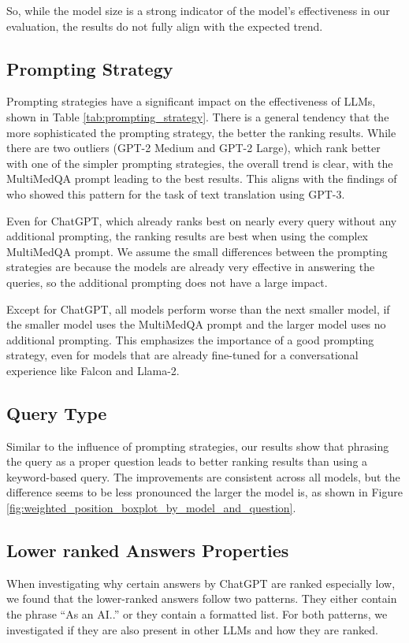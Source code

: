 So, while the model size is a strong indicator of the model's effectiveness in our evaluation, the results do not fully align with the expected trend.

\subsection{Prompting Strategy}
Prompting strategies have a significant impact on the effectiveness of LLMs, shown in Table \ref{tab:prompting_strategy}.
There is a general tendency that the more sophisticated the prompting strategy, the better the ranking results.
While there are two outliers (GPT-2 Medium and GPT-2 Large), which rank better with one of the simpler prompting strategies, the overall trend is clear, with the MultiMedQA prompt leading to the best results.
This aligns with the findings of \cite{reynolds:2021:Prompt} who showed this pattern for the task of text translation using GPT-3.

Even for ChatGPT, which already ranks best on nearly every query without any additional prompting, the ranking results are best when using the complex MultiMedQA prompt.
We assume the small differences between the prompting strategies are because the models are already very effective in answering the queries, so the additional prompting does not have a large impact.

Except for ChatGPT, all models perform worse than the next smaller model, if the smaller model uses the MultiMedQA prompt and the larger model uses no additional prompting.
This emphasizes the importance of a good prompting strategy, even for models that are already fine-tuned for a conversational experience like Falcon and Llama-2.

\subsection{Query Type}
Similar to the influence of prompting strategies, our results show that phrasing the query as a proper question leads to better ranking results than using a keyword-based query.
The improvements are consistent across all models, but the difference seems to be less pronounced the larger the model is, as shown in Figure \ref{fig:weighted_position_boxplot_by_model_and_question}.

\subsection{Lower ranked Answers Properties}
When investigating why certain answers by ChatGPT are ranked especially low, we found that the lower-ranked answers follow two patterns.
They either contain the phrase ``As an AI..'' or they contain a formatted list.
For both patterns, we investigated if they are also present in other LLMs and how they are ranked.

